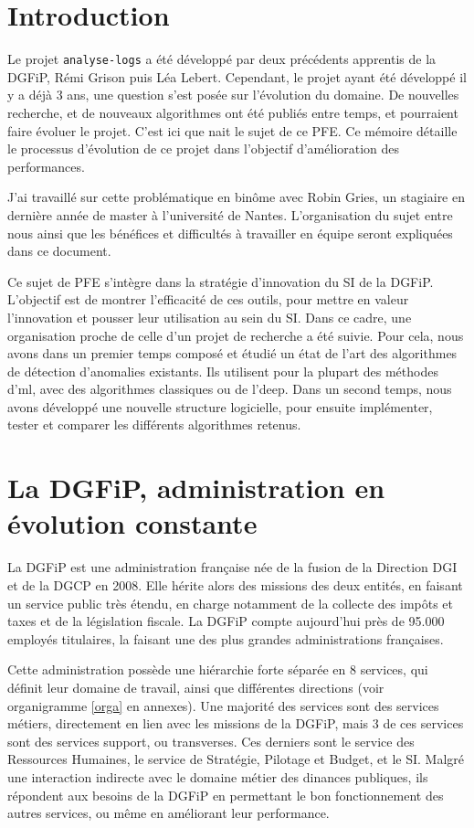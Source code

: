 \documentclass[openany, 11pt]{memoir}
\newcommand\chapters[1]{
	\chapter*{#1}
	\addcontentsline{toc}{chapter}{#1}
}
\begin{document}
\mainmatter
\pagestyle{fancy}
\glsresetall
\chapters{Introduction}

Le projet \texttt{analyse-logs} a été développé par deux précédents apprentis de la \gls{DGFiP}, Rémi Grison puis Léa Lebert. Cependant, le projet ayant été développé il y a déjà 3 ans, une question s'est posée sur l'évolution du domaine. De nouvelles recherche, et de nouveaux algorithmes ont été publiés entre temps, et pourraient faire évoluer le projet. C'est ici que nait le sujet de ce PFE. Ce mémoire détaille le processus d'évolution de ce projet dans l'objectif d'amélioration des performances.

\bigskip
J'ai travaillé sur cette problématique en binôme avec Robin Gries, un stagiaire en dernière année de master à l'université de Nantes. L'organisation du sujet entre nous ainsi que les bénéfices et difficultés à travailler en équipe seront expliquées dans ce document.

\bigskip
Ce sujet de PFE s'intègre dans la stratégie d'innovation du \gls{SI} de la \gls{DGFiP}. L'objectif est de montrer l'efficacité de ces outils, pour mettre en valeur l'innovation et pousser leur utilisation au sein du \gls{SI}. Dans ce cadre, une organisation proche de celle d'un projet de recherche a été suivie. Pour cela, nous avons dans un premier temps composé et étudié un état de l'art des algorithmes de détection d'anomalies existants. Ils utilisent pour la plupart des méthodes d'\gls{ml}, avec des algorithmes classiques ou de l'\gls{deep}. Dans un second temps, nous avons développé une nouvelle structure logicielle, pour ensuite implémenter, tester et comparer les différents algorithmes retenus.

\newpage
\chapter{La DGFiP, administration en évolution constante}
\label{dgfip}
La \gls{DGFiP} est une administration française née de la fusion de la Direction \gls{DGI} et de la \gls{DGCP} en 2008. Elle hérite alors des missions des deux entités, en faisant un service public très étendu, en charge notamment de la collecte des impôts et taxes et de la législation fiscale. La DGFiP compte aujourd'hui près de 95.000 employés titulaires, la faisant une des plus grandes administrations françaises.

Cette administration possède une hiérarchie forte séparée en 8 services, qui définit leur domaine de travail, ainsi que différentes directions (voir organigramme \ref{orga} en annexes). Une majorité des services sont des services métiers, directement en lien avec les missions de la \gls{DGFiP}, mais 3 de ces services sont des services support, ou \glspl{transverse}. Ces derniers sont le service des Ressources Humaines, le service de Stratégie, Pilotage et Budget, et le \gls{SI}. Malgré une interaction indirecte avec le domaine métier des dinances publiques, ils répondent aux besoins de la DGFiP en permettant le bon fonctionnement des autres services, ou même en améliorant leur performance.
\end{document}
